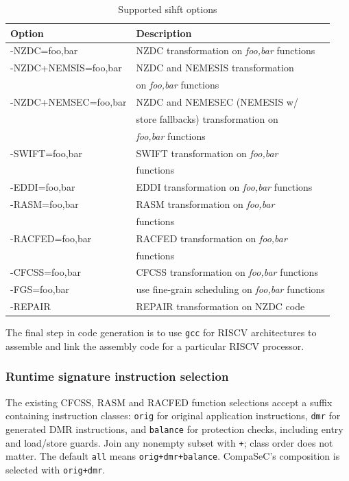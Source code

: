 \begin{table}[htb]
 \centering
 \caption{Supported \ac{sihft} options}
 \label{tab:sihft-options}

 \begin{tabular}{|l|l|}
  \hline
  \textbf{Option} & \textbf{Description}                                     \\
  \hline
  -NZDC=foo,bar   & NZDC transformation on \textit{foo,bar} functions  \\
 
  -NZDC+NEMSIS=foo,bar   & NZDC and NEMESIS transformation \\
  & on \textit{foo,bar} functions  \\
  
  -NZDC+NEMSEC=foo,bar   & NZDC and NEMESEC (NEMESIS w/\\ 
   & store fallbacks) transformation on \\
   &\textit{foo,bar} functions  \\
 
  -SWIFT=foo,bar  & SWIFT transformation 
  on \textit{foo,bar}\\ & functions  \\

  -EDDI=foo,bar & EDDI transformation on \textit{foo,bar} functions \\
  
  -RASM=foo,bar   & RASM transformation 
  on \textit{foo,bar}\\ & functions  \\
  
  -RACFED=foo,bar & RACFED transformation
   on \textit{foo,bar}\\ & functions  \\
  
  -CFCSS=foo,bar  & CFCSS transformation on \textit{foo,bar} functions \\
  
  -FGS=foo,bar    & use fine-grain scheduling on \textit{foo,bar} functions \\
  -REPAIR         & REPAIR transformation on NZDC code                   \\
  \hline
 \end{tabular}
\end{table}

The final step in code generation is to use \texttt{gcc} for RISCV architectures to assemble and link the
assembly code for a particular RISCV processor.

\subsubsection{Runtime signature instruction selection}
The existing CFCSS, RASM and RACFED function selections accept a suffix
containing instruction classes: \texttt{orig} for original application
instructions, \texttt{dmr} for generated DMR instructions, and
\texttt{balance} for protection checks, including entry and load/store guards.
Join any nonempty subset with \texttt{+}; class order does not matter.
The default \texttt{all} means \texttt{orig+dmr+balance}. CompaSeC's
composition is selected with \texttt{orig+dmr}.

